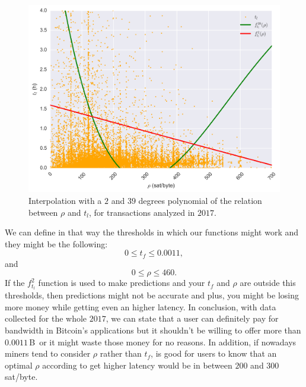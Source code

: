 \documentclass[USenglish]{uit-thesis}
\def\bitcoin{\leavevmode\rlap{\hskip.5pt-}B}
\begin{document}
\begin{figure}[h]
	\centering
	\includegraphics[width=1\textwidth]{img/feedensity_latency}
	\caption{Interpolation with a $2$ and $39$ degrees polynomial of the relation
		between $\rho$ and $t_l$, for transactions analyzed in $2017$.}
	\label{fig:feedensity_latency}
\end{figure}
We can define in that way the thresholds in which our functions
might work and they might be the following:
\[
0 \leq t_f \leq 0.0011,
\]
and
\[
0 \leq \rho \leq 460.
\]
If the $f_{t_l}^2$ function is used to make predictions and
your $t_f$ and $\rho$ are outside this thresholds,
then predictions might not be accurate and plus, you
might be losing more money while getting even an
higher latency. In conclusion, with data collected
for the whole $2017$, we can state that a user
can definitely pay for bandwidth in Bitcoin's
applications but it shouldn't be willing to
offer more than $0.0011$\,\bitcoin~or
it might waste those money for no reasons.
In addition, if nowadays miners tend to
consider $\rho$ rather than $t_f$, is good
for users to know that an optimal $\rho$ according to
get higher latency would be in between $200$
and $300$\,sat/byte.
\end{document}
